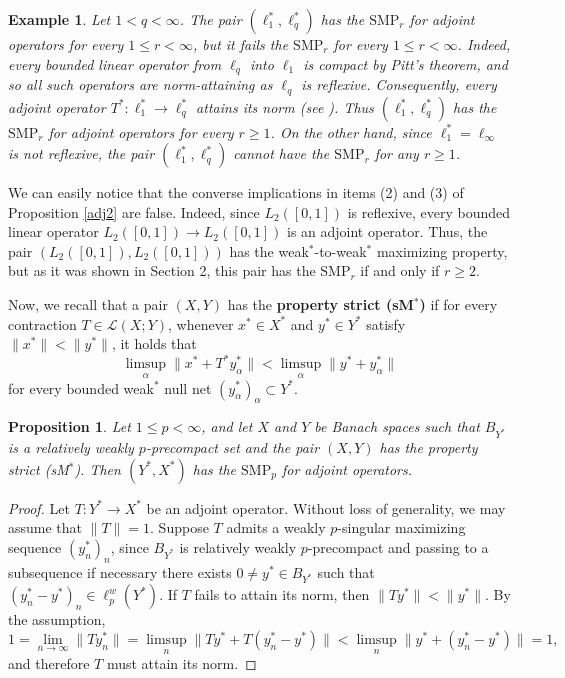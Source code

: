 \documentclass[12 pt]{article}%
\newtheorem{proposition}[theorem]{Proposition}
\newtheorem{example}[theorem]{Example}
\newtheorem{final remark}[theorem]{Final Remark}
\newcommand{\norma}[1]{\| #1 \|}
\begin{document}
\begin{example} \label{adj3} \rm  Let $1<q<\infty$. The pair $(\ell_1^*,\ell_q^*)$ has the $\mathrm{SMP}_r$ for adjoint operators for every $1\leq r<\infty$, but it fails the $\mathrm{SMP}_r$ for every $1\leq r<\infty$. Indeed, every bounded linear operator from $\ell_q$ into $\ell_1$ is compact by Pitt's theorem, and so all such operators are norm-attaining as $\ell_q$ is reflexive. Consequently, every adjoint operator $T^*: \ell_1^* \to \ell_q^*$ attains its norm (see \cite[Lemma 5.1]{garcia-lirola}).  Thus $(\ell_1^*,\ell_q^*)$ has the $\mathrm{SMP}_r$ for adjoint operators for every $r \geq 1$. On the other hand, 
since $\ell_1^* = \ell_\infty$ is not reflexive, the pair $(\ell_1^*, \ell_q^*)$ cannot have the $\mathrm{SMP}_r$ for any $r \geq 1$.
\end{example}

We can easily notice that the converse implications in items (2) and (3) of Proposition \ref{adj2} are false. Indeed, since $L_2([0,1])$ is reflexive, every bounded linear operator $L_2([0,1]) \to L_2([0,1])$ is an adjoint operator. Thus, the pair $(L_2([0,1]), L_2([0,1]))$ has the 
weak$^*$-to-weak$^*$ maximizing property, but as it was shown in Section 2, this pair has the $\mathrm{SMP}_r$ if and only if $r \geq 2$. 




Now, we recall that a pair $(X, Y)$ has the {\bf property strict (sM$^*$)} if for every contraction $T \in \mathcal{L}(X; Y)$, whenever $x^*\in X^*$ and $y^*\in Y^*$ satisfy $\norma{x^*} < \norma{y^*}$, it holds that 
$$\limsup_\alpha \norma{x^*+T^*y_\alpha^*} < \limsup_\alpha \norma{y^*+y_\alpha^*}$$
for every bounded weak$^*$ null net $(y_\alpha^*)_\alpha\subset Y^*$. 

\begin{proposition}\label{more-dual1}
Let $1\leq p<\infty$, and let $X$ and $Y$ be Banach spaces such that $B_{Y^*}$ is a relatively weakly $p$-precompact set and the pair $(X, Y)$ has the property strict (sM$^*$). Then $(Y^*,X^*)$ has the $\mathrm{SMP}_p$ for adjoint operators.
\end{proposition}

\begin{proof}
 Let $T: Y^{*} \to X^{*}$ be an adjoint operator. Without loss of generality, we may assume that $\norma{T}=1$. Suppose $T$ admits a weakly $p$-singular maximizing sequence $(y_{n}^{*})_{n}$, since $B_{Y^{*}}$ is relatively weakly $p$-precompact and passing to a subsequence if necessary there exists $0 \neq y^{*} \in B_{Y^{*}}$ such that $(y_{n}^{*}-y^{*})_{n} \in \ell_{p}^{w}(Y^{*})$. If $T$ fails to attain its norm, then $\norma{Ty^{*}}<\norma{y^{*}}$. By the assumption, $$1= \lim_{n\to \infty} \norma{Ty_{n}^{*}}=\limsup_{n}\norma{Ty^{*}+T(y_{n}^{*}-y^{*})}<\limsup_{n}\norma{ y^{*}+ (y_{n}^{*}-y^{*})}=1,$$ and therefore $T$ must attain its norm.
\end{proof}
\end{document}
